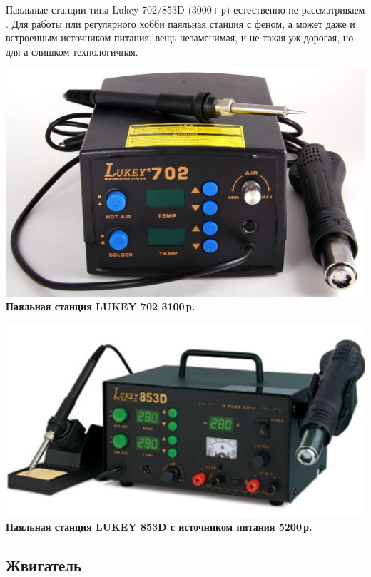 \documentclass{magazine}
\begin{document}
{Паяльные станции типа Lukey 702/853D (3000+\,р) естественно не рассматриваем
\smiley. Для работы или регулярного хобби паяльная станция с феном, а может даже
и встроенным источником питания, вещь незаменимая, и не такая уж дорогая, но для
\scr а слишком технологичная.

\noindent\href{http://voltmaster-samara.ru/catalog/product/00073444/}{
\includegraphics[width=\columnwidth]{fig/00/Lukey702.jpg}}
\textbf{Паяльная станция LUKEY 702 3100\,р.}

\noindent\href{http://shop.siriust.ru/product\_info.php/cPath/23\_28\_269/products\_id/15290}{
\includegraphics[width=\columnwidth]{fig/00/Lukey853D.jpg}}
\textbf{Паяльная станция LUKEY 853D с источником питания 5200\,р.}

\subsection{Жвигатель}

}
\end{document}
